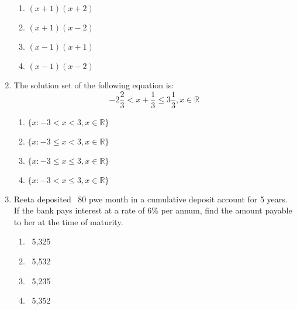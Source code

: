 \begin{enumerate}[label=(\roman*)]
        \begin{multicols}{2}
        \begin{enumerate}[label=(\alph*)]
            \item $(x+1)(x+2)$ 
            \item $(x+1)(x-2)$ 
            \item $(x-1)(x+1)$ 
            \item $(x-1)(x-2)$ 
        \end{enumerate}
        \end{multicols}

    \item The solution set of the following equation is:
        \[
            -2\frac{2}{3} < x + \frac{1}{3} \leq 3\frac{1}{3}, x \in \mathbb{R}
        \]

        \begin{multicols}{2}
        \begin{enumerate}[label=(\alph*)]
            \item $\{ x : -3 < x < 3, x \in \mathbb{R} \}$
            \item $\{ x : -3 \leq x < 3, x \in \mathbb{R} \}$
            \item $\{ x : -3 \leq x \leq 3, x \in \mathbb{R} \}$
            \item $\{ x : -3 < x \leq 3, x \in \mathbb{R} \}$
        \end{enumerate}
        \end{multicols}

    \item Reeta deposited \rupee~80 pwe month in a cumulative deposit account
        for 5 years. If the bank pays interest at a rate of 6\% per annum, 
        find the amount payable to her at the time of maturity.

        \begin{multicols}{2}
        \begin{enumerate}[label=(\alph*)]
            \item \rupee~5,325 
            \item \rupee~5,532
            \item \rupee~5,235
            \item \rupee~5,352 
        \end{enumerate}
        \end{multicols}


\end{enumerate}
